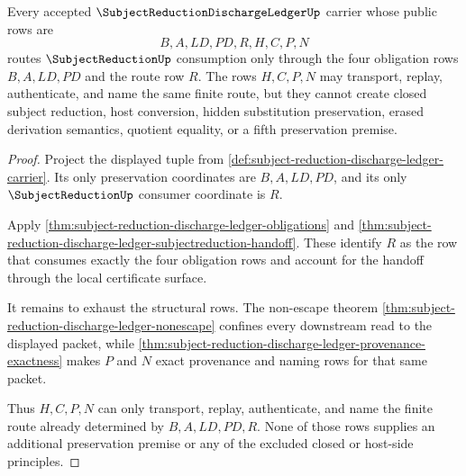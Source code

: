 \begin{theorem}
\label{thm:subject-reduction-discharge-ledger-route-exhaustion}
Every accepted $\SubjectReductionDischargeLedgerUp$ carrier whose public rows are
$$
B,A,LD,PD,R,H,C,P,N
$$
routes $\SubjectReductionUp$ consumption only through the four obligation rows $B,A,LD,PD$ and the route row $R$. The rows $H,C,P,N$ may transport, replay, authenticate, and name the same finite route, but they cannot create closed subject reduction, host conversion, hidden substitution preservation, erased derivation semantics, quotient equality, or a fifth preservation premise.
\end{theorem}
\begin{proof}
Project the displayed tuple from \autoref{def:subject-reduction-discharge-ledger-carrier}. Its only preservation coordinates are $B,A,LD,PD$, and its only $\SubjectReductionUp$ consumer coordinate is $R$.

Apply \autoref{thm:subject-reduction-discharge-ledger-obligations} and \autoref{thm:subject-reduction-discharge-ledger-subjectreduction-handoff}. These identify $R$ as the row that consumes exactly the four obligation rows and account for the handoff through the local certificate surface.

It remains to exhaust the structural rows. The non-escape theorem \autoref{thm:subject-reduction-discharge-ledger-nonescape} confines every downstream read to the displayed packet, while \autoref{thm:subject-reduction-discharge-ledger-provenance-exactness} makes $P$ and $N$ exact provenance and naming rows for that same packet.

Thus $H,C,P,N$ can only transport, replay, authenticate, and name the finite route already determined by $B,A,LD,PD,R$. None of those rows supplies an additional preservation premise or any of the excluded closed or host-side principles.
\end{proof}


